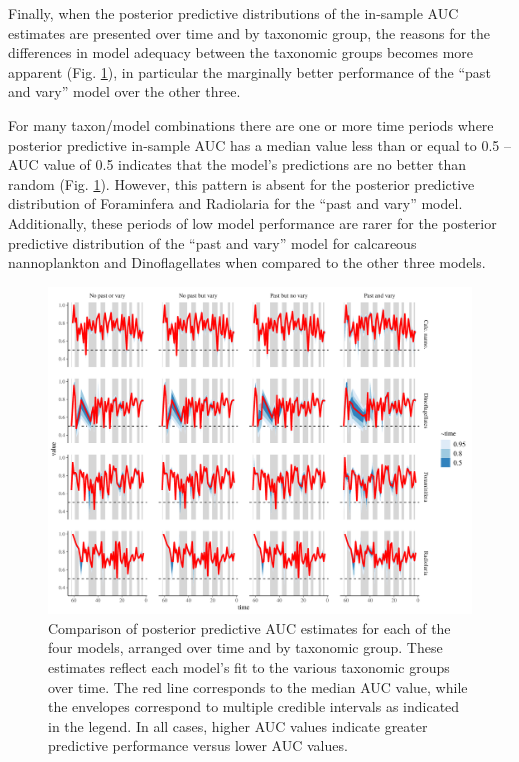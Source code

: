 \documentclass[12pt,letterpaper]{article}
\begin{document}
Finally, when the posterior predictive distributions of the in-sample AUC estimates are presented over time and by taxonomic group, the reasons for the differences in model adequacy between the taxonomic groups becomes more apparent (Fig. \ref{fig:auc_taxon_time}), in particular the marginally better performance of the ``past and vary'' model over the other three. 

For many taxon/model combinations there are one or more time periods where posterior predictive in-sample AUC has a median value less than or equal to 0.5 -- AUC value of 0.5 indicates that the model's predictions are no better than random (Fig. \ref{fig:auc_taxon_time}). However, this pattern is absent for the posterior predictive distribution of Foraminfera and Radiolaria for the ``past and vary'' model. Additionally, these periods of low model performance are rarer for the posterior predictive distribution of the ``past and vary'' model for calcareous nannoplankton and Dinoflagellates when compared to the other three models.
\begin{figure}[ht]
  \centering
  \includegraphics[width=\textwidth,height=0.5\textheight,keepaspectratio=true]{../results/figure/auc_taxon_time}
  \caption{Comparison of posterior predictive AUC estimates for each of the four models, arranged over time and by taxonomic group. These estimates reflect each model's fit to the various taxonomic groups over time. The red line corresponds to the median AUC value, while the envelopes correspond to multiple credible intervals as indicated in the legend. In all cases, higher AUC values indicate greater predictive performance versus lower AUC values.}
  \label{fig:auc_taxon_time}
\end{figure}
\end{document}
